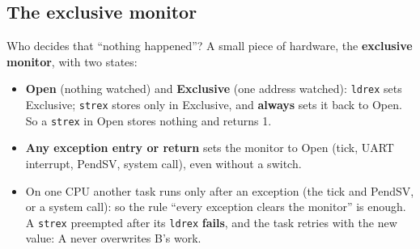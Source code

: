 \subsection{The exclusive monitor}
Who decides that ``nothing happened''? A small piece of hardware, the \textbf{exclusive monitor}, with two states:
\begin{itemize}
    \item \textbf{Open} (nothing watched) and \textbf{Exclusive} (one address watched): \texttt{ldrex} sets Exclusive; \texttt{strex} stores only in Exclusive, and \textbf{always} sets it back to Open. So a \texttt{strex} in Open stores nothing and returns 1.
    \item \textbf{Any exception entry or return} sets the monitor to Open (tick, UART interrupt, PendSV, system call), even without a switch.
    \item On one CPU another task runs only after an exception (the tick and PendSV, or a system call): so the rule ``every exception clears the monitor'' is enough. A \texttt{strex} preempted after its \texttt{ldrex} \textbf{fails}, and the task retries with the new value: A never overwrites B's work.
\end{itemize}

